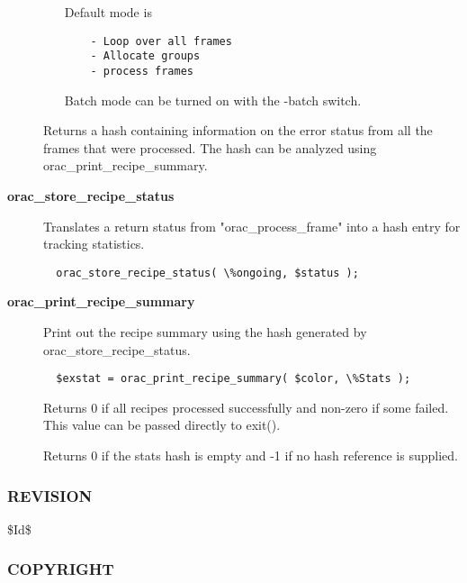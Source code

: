 \begin{description}
\begin{enumerate}
Default mode is

\begin{verbatim}
    - Loop over all frames
    - Allocate groups
    - process frames
\end{verbatim}


Batch mode can be turned on with the -batch switch.

\end{enumerate}


Returns a hash containing information on the error status
from all the frames that were processed. The hash can be
analyzed using orac\_print\_recipe\_summary.


\item[{\textbf{orac\_store\_recipe\_status}}] \mbox{}

Translates a return status from "orac\_process\_frame" into a
hash entry for tracking statistics.

\begin{verbatim}
  orac_store_recipe_status( \%ongoing, $status );
\end{verbatim}

\item[{\textbf{orac\_print\_recipe\_summary}}] \mbox{}

Print out the recipe summary using the hash generated by
orac\_store\_recipe\_status.

\begin{verbatim}
  $exstat = orac_print_recipe_summary( $color, \%Stats );
\end{verbatim}


Returns 0 if all recipes processed successfully and non-zero
if some failed. This value can be passed directly to exit().



Returns 0 if the stats hash is empty and -1 if no hash
reference is supplied.

\end{description}
\subsubsection*{REVISION\label{ORAC::Core_REVISION}}


\$Id\$

\subsubsection*{COPYRIGHT\label{ORAC::Core_COPYRIGHT}}


